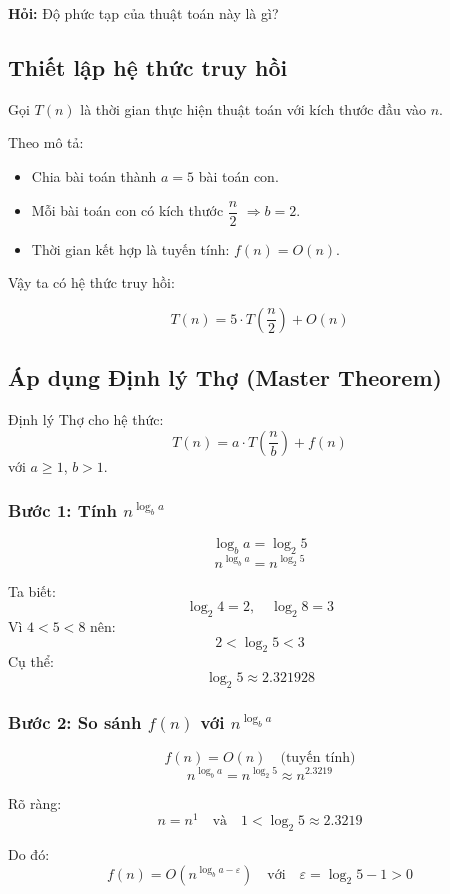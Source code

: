 \documentclass{article}
\begin{document}
\textbf{Hỏi:} Độ phức tạp của thuật toán này là gì?

\subsection{Thiết lập hệ thức truy hồi}

Gọi \(T(n)\) là thời gian thực hiện thuật toán với kích thước đầu vào \(n\).

Theo mô tả:
\begin{itemize}
    \item Chia bài toán thành \(a = 5\) bài toán con.
    \item Mỗi bài toán con có kích thước \(\dfrac{n}{2}\) \(\Rightarrow b = 2\).
    \item Thời gian kết hợp là tuyến tính: \(f(n) = O(n)\).
\end{itemize}

Vậy ta có hệ thức truy hồi:

\[
\boxed{T(n) = 5 \cdot T\left(\frac{n}{2}\right) + O(n)}
\]

\subsection{Áp dụng Định lý Thợ (Master Theorem)}

Định lý Thợ cho hệ thức:
\[
T(n) = a \cdot T\left(\frac{n}{b}\right) + f(n)
\]
với \(a \ge 1\), \(b > 1\).

\subsubsection{Bước 1: Tính \(n^{\log_b a}\)}

\[
\log_b a = \log_2 5
\]
\[
n^{\log_b a} = n^{\log_2 5}
\]

Ta biết:
\[
\log_2 4 = 2, \quad \log_2 8 = 3
\]
Vì \(4 < 5 < 8\) nên:
\[
2 < \log_2 5 < 3
\]
Cụ thể:
\[
\log_2 5 \approx 2.321928
\]

\subsubsection{Bước 2: So sánh \(f(n)\) với \(n^{\log_b a}\)}

\[
f(n) = O(n) \quad \text{(tuyến tính)}
\]
\[
n^{\log_b a} = n^{\log_2 5} \approx n^{2.3219}
\]

Rõ ràng:
\[
n = n^{1} \quad \text{và} \quad 1 < \log_2 5 \approx 2.3219
\]

Do đó:
\[
f(n) = O\left(n^{\log_b a - \varepsilon}\right) \quad \text{với} \quad \varepsilon = \log_2 5 - 1 > 0
\]
\end{document}
